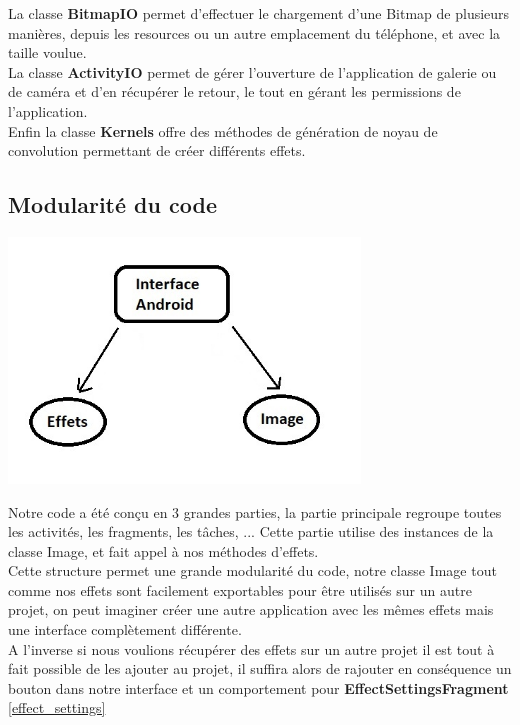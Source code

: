La classe \textbf{BitmapIO} permet d'effectuer le chargement d'une Bitmap de plusieurs manières, depuis les resources ou un autre emplacement du téléphone, et avec la taille voulue.
\\

La classe \textbf{ActivityIO} permet de gérer l'ouverture de l'application de galerie ou de caméra et d'en récupérer le retour, le tout en gérant les permissions de l'application.
\\

Enfin la classe \textbf{Kernels} offre des méthodes de génération de noyau de convolution permettant de créer différents effets.
\\

\subsection{Modularité du code}
\begin{center}
    \includegraphics[width=0.7\textwidth]{report_src/structure.jpg}
\end{center}
Notre code a été conçu en 3 grandes parties, la partie principale regroupe toutes les activités, les fragments, les tâches, ... Cette partie utilise des instances de la classe Image, et fait appel à nos méthodes d'effets.
\\

Cette structure permet une grande modularité du code, notre classe Image tout comme nos effets sont facilement exportables pour être utilisés sur un autre projet, on peut imaginer créer une autre application avec les mêmes effets mais une interface complètement différente.
\\
A l'inverse si nous voulions récupérer des effets sur un autre projet il est tout à fait possible de les ajouter au projet, il suffira alors de rajouter en conséquence un bouton dans notre interface et un comportement pour \textbf{EffectSettingsFragment} \ref{effect_settings}
